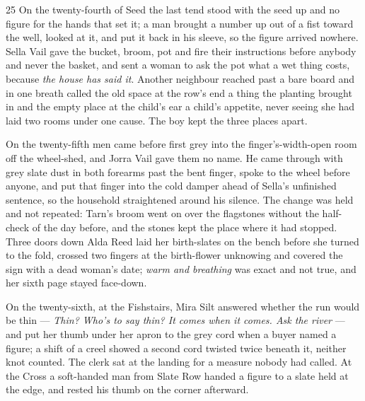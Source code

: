 
\scenebreak


\scenebreak


\scenebreak

\CRtailpiece
\begin{CRchronicle}{25}
On the twenty-fourth of Seed the last tend stood with the seed up and no figure for the hands that set it; a man brought a number up out of a fist toward the well, looked at it, and put it back in his sleeve, so the figure arrived nowhere. Sella Vail gave the bucket, broom, pot and fire their instructions before anybody and never the basket, and sent a woman to ask the pot what a wet thing costs, because \emph{the house has said it}. Another neighbour reached past a bare board and in one breath called the old space at the row’s end a thing the planting brought in and the empty place at the child’s ear a child’s appetite, never seeing she had laid two rooms under one cause. The boy kept the three places apart.

On the twenty-fifth men came before first grey into the finger’s-width-open room off the wheel-shed, and Jorra Vail gave them no name. He came through with grey slate dust in both forearms past the bent finger, spoke to the wheel before anyone, and put that finger into the cold damper ahead of Sella’s unfinished sentence, so the household straightened around his silence. The change was held and not repeated: Tarn’s broom went on over the flagstones without the half-check of the day before, and the stones kept the place where it had stopped. Three doors down Alda Reed laid her birth-slates on the bench before she turned to the fold, crossed two fingers at the birth-flower unknowing and covered the sign with a dead woman’s date; \emph{warm and breathing} was exact and not true, and her sixth page stayed face-down.

On the twenty-sixth, at the Fishstairs, Mira Silt answered whether the run would be thin --- \emph{Thin? Who’s to say thin? It comes when it comes. Ask the river} --- and put her thumb under her apron to the grey cord when a buyer named a figure; a shift of a creel showed a second cord twisted twice beneath it, neither knot counted. The clerk sat at the landing for a measure nobody had called. At the Cross a soft-handed man from Slate Row handed a figure to a slate held at the edge, and rested his thumb on the corner afterward.


\end{CRchronicle}
